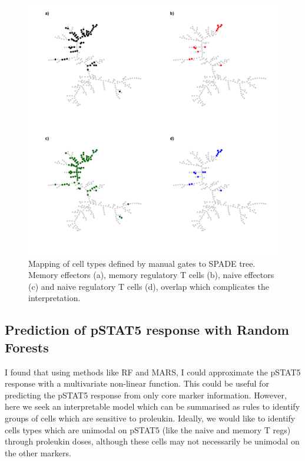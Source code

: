\begin{figure}[h]
    \centering
    \includegraphics[scale=.5]{IL2/figures/spade-celltypes.pdf}
    {Mapping of cell types defined by manual gates to SPADE tree.}
    {
      Memory effectors (a), memory regulatory T cells (b), naive effectors (c) and naive regulatory T cells (d), overlap which complicates
      the interpretation.
    }
\end{figure}



\subsection{Prediction of pSTAT5 response with Random Forests}

I found that using methods like \gls{RF} and \gls{MARS}, I could approximate the pSTAT5 response with a multivariate non-linear function.
This could be useful for predicting the pSTAT5 response from only core marker information.
However, here we seek an interpretable model which can be summarised as rules to identify groups of cells which are sensitive to proleukin.
Ideally, we would like to identify cells types which are unimodal on pSTAT5 (like the naive and memory T regs) through proleukin doses,
although these cells may not necessarily be unimodal on the other markers.

